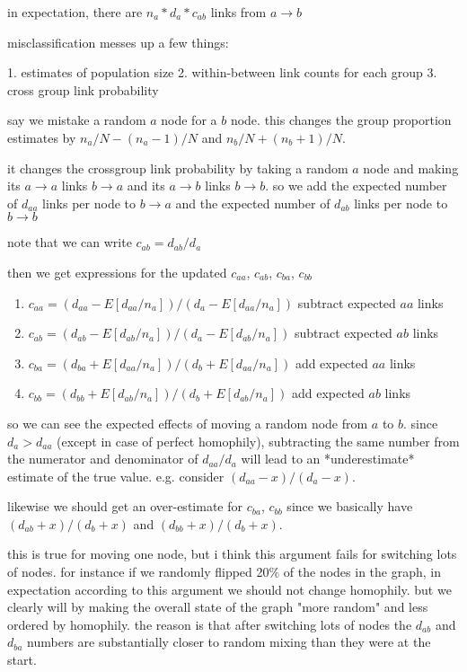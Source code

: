 \documentclass[a4paper]{article}
\begin{document}
in expectation, there are $n_a * d_a * c_{ab}$ links from $a\to b$

misclassification messes up a few things:

1. estimates of population size
2. within-between link counts for each group
3. cross group link probability

say we mistake a random $a$ node for a $b$ node. this changes the group proportion estimates by $n_a/N - (n_a - 1)/N$ and $n_b/N + (n_b + 1)/N$.

it changes the crossgroup link probability by taking a random $a$ node and making its $a\to a$ links $b\to a$ and its $a\to b$ links $b\to b$. so we add the expected number of $d_{aa}$ links per node to $b\to a$ and the expected number of $d_{ab}$ links per node to $b\to b$

note that we can write $c_{ab} = d_{ab} / d_a$

then we get expressions for the updated $c_{aa}$, $c_{ab}$, $c_{ba}$, $c_{bb}$

\begin{enumerate}
\item $c_{aa} = (d_{aa} - E[d_{aa}/n_a]) / (d_a - E[d_{aa}/n_a])$ subtract expected $aa$ links
\item $c_{ab} = (d_{ab} - E[d_{ab}/n_a]) / (d_a - E[d_{ab}/n_a])$ subtract expected $ab$ links
\item $c_{ba} = (d_{ba} + E[d_{aa}/n_a]) / (d_b + E[d_{aa}/n_a])$ add expected $aa$ links
\item $c_{bb} = (d_{bb} + E[d_{ab}/n_a]) / (d_b + E[d_{ab}/n_a])$ add expected $ab$ links
\end{enumerate}


so we can see the expected effects of moving a random node from $a$ to $b$. since $d_a > d_{aa}$ (except in case of perfect homophily), subtracting the same number from the numerator and denominator of $d_{aa} / d_a$ will lead to an *underestimate* estimate of the true value. e.g. consider $(d_{aa} - x) / (d_a - x)$.

likewise we should get an over-estimate for $c_{ba}$, $c_{bb}$ since we basically have $(d_{ab} + x) / (d_b + x)$ and $(d_{bb} + x) / (d_b + x)$.

this is true for moving one node, but i think this argument fails for switching lots of nodes. for instance if we randomly flipped 20\% of the nodes in the graph, in expectation according to this argument we should not change homophily. but we clearly will by making the overall state of the graph "more random" and less ordered by homophily. the reason is that after switching lots of nodes the $d_{ab}$ and $d_{ba}$ numbers are substantially closer to random mixing than they were at the start.
\end{document}
